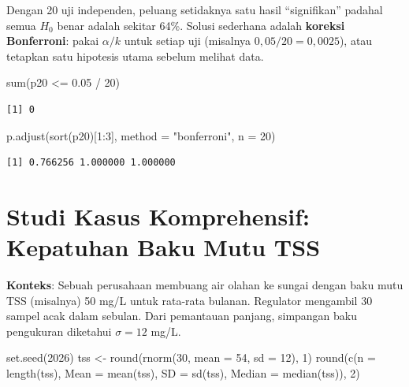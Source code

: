 \documentclass[
  indonesian,
  letterpaper,
]{book}
\newenvironment{Shaded}{\begin{snugshade}}{\end{snugshade}}
\newcommand{\AttributeTok}[1]{\textcolor[rgb]{0.40,0.45,0.13}{#1}}
\newcommand{\DecValTok}[1]{\textcolor[rgb]{0.68,0.00,0.00}{#1}}
\newcommand{\FloatTok}[1]{\textcolor[rgb]{0.68,0.00,0.00}{#1}}
\newcommand{\FunctionTok}[1]{\textcolor[rgb]{0.28,0.35,0.67}{#1}}
\newcommand{\NormalTok}[1]{\textcolor[rgb]{0.00,0.23,0.31}{#1}}
\newcommand{\OtherTok}[1]{\textcolor[rgb]{0.00,0.23,0.31}{#1}}
\newcommand{\SpecialCharTok}[1]{\textcolor[rgb]{0.37,0.37,0.37}{#1}}
\newcommand{\StringTok}[1]{\textcolor[rgb]{0.13,0.47,0.30}{#1}}
\begin{document}
Dengan 20 uji independen, peluang setidaknya satu hasil ``signifikan''
padahal semua \(H_0\) benar adalah sekitar 64\%. Solusi sederhana adalah
\textbf{koreksi Bonferroni}: pakai \(\alpha/k\) untuk setiap uji
(misalnya \(0{,}05/20 = 0{,}0025\)), atau tetapkan satu hipotesis utama
sebelum melihat data.

\begin{Shaded}
\begin{Highlighting}[]
\FunctionTok{sum}\NormalTok{(p20 }\SpecialCharTok{\textless{}=} \FloatTok{0.05} \SpecialCharTok{/} \DecValTok{20}\NormalTok{)}
\end{Highlighting}
\end{Shaded}

\begin{verbatim}
[1] 0
\end{verbatim}

\begin{Shaded}
\begin{Highlighting}[]
\FunctionTok{p.adjust}\NormalTok{(}\FunctionTok{sort}\NormalTok{(p20)[}\DecValTok{1}\SpecialCharTok{:}\DecValTok{3}\NormalTok{], }\AttributeTok{method =} \StringTok{"bonferroni"}\NormalTok{, }\AttributeTok{n =} \DecValTok{20}\NormalTok{)}
\end{Highlighting}
\end{Shaded}

\begin{verbatim}
[1] 0.766256 1.000000 1.000000
\end{verbatim}

\section{Studi Kasus Komprehensif: Kepatuhan Baku Mutu
TSS}\label{studi-kasus-komprehensif-kepatuhan-baku-mutu-tss}

\textbf{Konteks}: Sebuah perusahaan membuang air olahan ke sungai dengan
baku mutu TSS (misalnya) 50 mg/L untuk rata-rata bulanan. Regulator
mengambil 30 sampel acak dalam sebulan. Dari pemantauan panjang,
simpangan baku pengukuran diketahui \(\sigma = 12\) mg/L.

\begin{Shaded}
\begin{Highlighting}[]
\FunctionTok{set.seed}\NormalTok{(}\DecValTok{2026}\NormalTok{)}
\NormalTok{tss }\OtherTok{\textless{}{-}} \FunctionTok{round}\NormalTok{(}\FunctionTok{rnorm}\NormalTok{(}\DecValTok{30}\NormalTok{, }\AttributeTok{mean =} \DecValTok{54}\NormalTok{, }\AttributeTok{sd =} \DecValTok{12}\NormalTok{), }\DecValTok{1}\NormalTok{)}
\FunctionTok{round}\NormalTok{(}\FunctionTok{c}\NormalTok{(}\AttributeTok{n =} \FunctionTok{length}\NormalTok{(tss), }\AttributeTok{Mean =} \FunctionTok{mean}\NormalTok{(tss), }\AttributeTok{SD =} \FunctionTok{sd}\NormalTok{(tss), }\AttributeTok{Median =} \FunctionTok{median}\NormalTok{(tss)), }\DecValTok{2}\NormalTok{)}
\end{Highlighting}
\end{Shaded}
\end{document}
